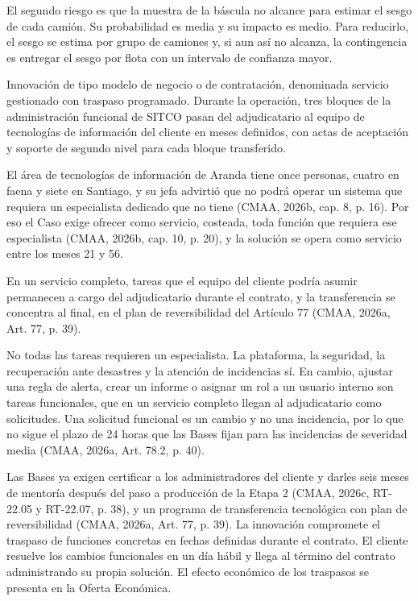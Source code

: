 \documentclass[subdoc]{../../comun/overfore}
\begin{document}
El segundo riesgo es que la muestra de la báscula no alcance para estimar el sesgo de cada camión. Su probabilidad es media y su impacto es medio. Para reducirlo, el sesgo se estima por grupo de camiones y, si aun así no alcanza, la contingencia es entregar el sesgo por flota con un intervalo de confianza mayor.

Innovación de tipo modelo de negocio o de contratación, denominada servicio gestionado con traspaso programado. Durante la operación, tres bloques de la administración funcional de SITCO pasan del adjudicatario al equipo de tecnologías de información del cliente en meses definidos, con actas de aceptación y soporte de segundo nivel para cada bloque transferido.

El área de tecnologías de información de Aranda tiene once personas, cuatro en faena y siete en Santiago, y su jefa advirtió que no podrá operar un sistema que requiera un especialista dedicado que no tiene (CMAA, 2026b, cap. 8, p. 16). Por eso el Caso exige ofrecer como servicio, costeada, toda función que requiera ese especialista (CMAA, 2026b, cap. 10, p. 20), y la solución se opera como servicio entre los meses 21 y 56.

En un servicio completo, tareas que el equipo del cliente podría asumir permanecen a cargo del adjudicatario durante el contrato, y la transferencia se concentra al final, en el plan de reversibilidad del Artículo 77 (CMAA, 2026a, Art. 77, p. 39).

No todas las tareas requieren un especialista. La plataforma, la seguridad, la recuperación ante desastres y la atención de incidencias sí. En cambio, ajustar una regla de alerta, crear un informe o asignar un rol a un usuario interno son tareas funcionales, que en un servicio completo llegan al adjudicatario como solicitudes. Una solicitud funcional es un cambio y no una incidencia, por lo que no sigue el plazo de 24 horas que las Bases fijan para las incidencias de severidad media (CMAA, 2026a, Art. 78.2, p. 40).

Las Bases ya exigen certificar a los administradores del cliente y darles seis meses de mentoría después del paso a producción de la Etapa 2 (CMAA, 2026c, RT-22.05 y RT-22.07, p. 38), y un programa de transferencia tecnológica con plan de reversibilidad (CMAA, 2026a, Art. 77, p. 39). La innovación compromete el traspaso de funciones concretas en fechas definidas durante el contrato. El cliente resuelve los cambios funcionales en un día hábil y llega al término del contrato administrando su propia solución. El efecto económico de los traspasos se presenta en la Oferta Económica.
\end{document}
